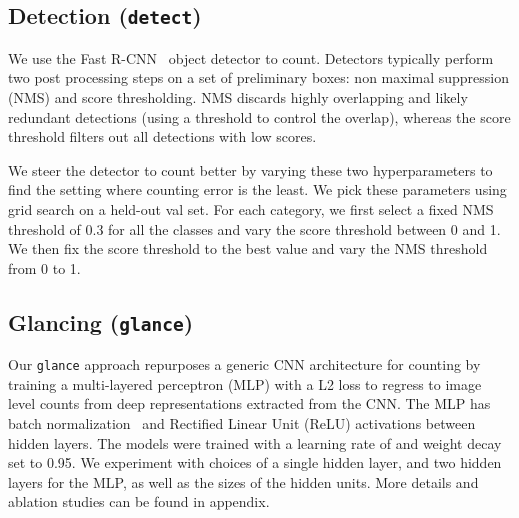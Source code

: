 \documentclass[10pt,twocolumn,letterpaper]{article}
\newcommand{\detect}{\texttt{detect}\xspace}
\newcommand{\glance}{\texttt{glance}\xspace}
\begin{document}
\subsection{Detection (\detect{})}\label{app:frcn} We use the Fast R-CNN~\cite{Girshick2015FastR-CNN} object detector to count. Detectors typically perform two post processing steps on a set of preliminary boxes: non maximal suppression (NMS) and score thresholding. NMS discards highly overlapping and likely redundant detections (using a threshold to control the overlap), whereas the score threshold filters out all detections with low scores. 


We steer the detector to count better by varying these two hyperparameters to find the setting where counting error is the least. We pick these parameters using grid search on a held-out val set. For each category, we first select a fixed NMS threshold of 0.3
for all the classes and vary the score threshold between 0 and 1. We then fix the score threshold to the best value and vary the NMS threshold from 0 to 1. 

\subsection{Glancing (\glance{})}\label{app:glance}
Our \glance approach repurposes a generic CNN architecture for counting by training a multi-layered perceptron (MLP) with a L2 loss to regress to image level counts from deep representations extracted from the CNN. The MLP has batch normalization~\cite{Ioffe2015} and Rectified Linear Unit (ReLU) activations between hidden layers. The models were trained with a learning rate of  and weight decay set to 0.95. We experiment with choices of a single hidden layer, and two hidden layers for the MLP, as well as the sizes of the hidden units. More details and ablation studies can be found in appendix.


\vspace{-8pt}
\end{document}
